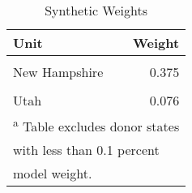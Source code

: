 \begin{table}[H]

\caption{\label{tab:unit_weight_table_colorado}Synthetic Weights}
\centering
\begin{tabular}[t]{lr}
\toprule
Unit & Weight\\
\midrule
\cellcolor{gray!6}{Arizona} & \cellcolor{gray!6}{0.454}\\
New Hampshire & 0.375\\
\cellcolor{gray!6}{District of Columbia} & \cellcolor{gray!6}{0.095}\\
Utah & 0.076\\
\bottomrule
\multicolumn{2}{l}{\textsuperscript{a} Table excludes donor states}\\
\multicolumn{2}{l}{with less than 0.1 percent}\\
\multicolumn{2}{l}{model weight.}\\
\end{tabular}
\end{table}
